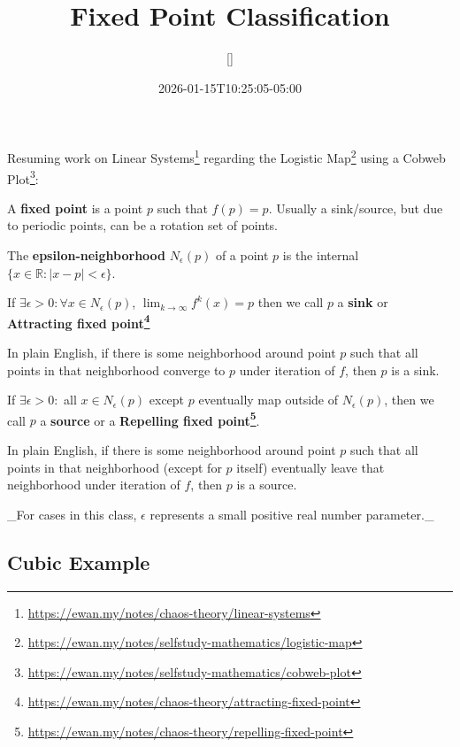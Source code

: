 \documentclass[11pt,a4paper]{article}
\title{Fixed Point Classification}
\author{[]}
\date{2026-01-15T10:25:05-05:00}
\begin{document}
\maketitle

Resuming work on Linear Systems\footnote{\url{https://ewan.my/notes/chaos-theory/linear-systems}} regarding the Logistic Map\footnote{\url{https://ewan.my/notes/selfstudy-mathematics/logistic-map}} using a Cobweb Plot\footnote{\url{https://ewan.my/notes/selfstudy-mathematics/cobweb-plot}}:

A \textbf{fixed point} is a point $p$ such that $f(p) = p$. Usually a sink/source, but due to periodic points, can be a rotation set of points.

\begin{displayquote}
The \textbf{epsilon-neighborhood} $N_{\epsilon}(p)$ of a point $p$ is the internal $\{ x \in \mathbb{R}: |x-p| < \epsilon \}$.
\end{displayquote}

\begin{displayquote}
If $\exists \epsilon > 0 : \forall x  \in N_{\epsilon}(p)$, $\lim_{ k \to \infty }f^{k}(x) = p$ then we call $p$ a \textbf{sink} or \textbf{Attracting fixed point\footnote{\url{https://ewan.my/notes/chaos-theory/attracting-fixed-point}}}
\end{displayquote}

In plain English, if there is some neighborhood around point $p$ such that all points in that neighborhood converge to $p$ under iteration of $f$, then $p$ is a sink.

\begin{displayquote}
If $\exists \epsilon > 0 :$ all $x \in N_{\epsilon}(p)$ except $p$ eventually map outside of $N_{\epsilon}(p)$, then we call $p$ a \textbf{source} or a \textbf{Repelling fixed point\footnote{\url{https://ewan.my/notes/chaos-theory/repelling-fixed-point}}}.
\end{displayquote}

In plain English, if there is some neighborhood around point $p$ such that all points in that neighborhood (except for $p$ itself) eventually leave that neighborhood under iteration of $f$, then $p$ is a source.

_For cases in this class, $\epsilon$ represents a small positive real number parameter._

\hrulefill

\subsection{Cubic Example}
\end{document}
